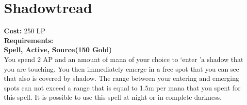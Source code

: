 \section{Shadowtread}\label{spell:shadowtread}
\textbf{Cost:} 250 LP\\
\textbf{Requirements:}\\
\textbf{Spell, Active, Source(150 Gold)}\\
You spend 2 AP and an amount of mana of your choice to \lq enter \rq a shadow that you are touching.
You then immediately emerge in a free spot that you can see that also is covered by shadow.
The range between your entering and emerging spots can not exceed a range that is equal to 1.5m per mana that you spent for this spell.
It is possible to use this spell at night or in complete darkness.\\